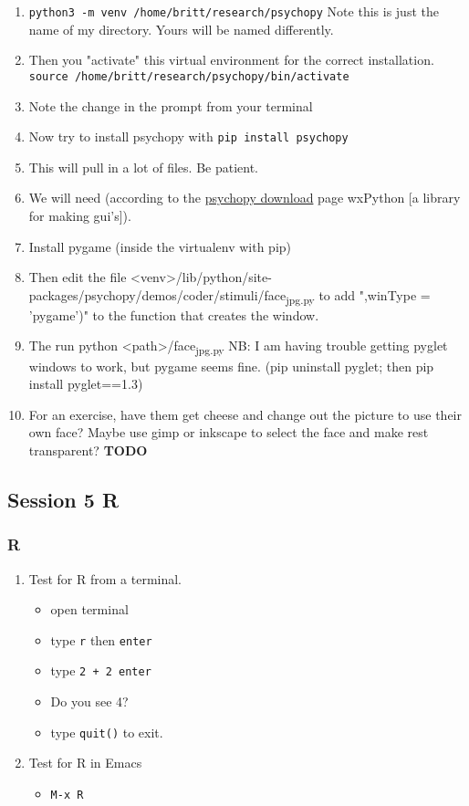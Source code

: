 \documentclass{article}
\begin{document}
\begin{enumerate}
\begin{enumerate}
\begin{enumerate}
\begin{enumerate}
\item \texttt{python3 -m venv /home/britt/research/psychopy}
Note this is just the name of my directory. Yours will be named differently.
\item Then you "activate" this virtual environment for the correct installation.
\texttt{source /home/britt/research/psychopy/bin/activate}
\item Note the change in the prompt from your terminal
\item Now try to install psychopy with
\texttt{pip install psychopy}
\item This will pull in  a lot of files. Be patient.
\item We will need (according to the \href{https://www.psychopy.org/download.html\#download}{psychopy download} page wxPython [a library for making gui's]).
\item Install pygame (inside the virtualenv with pip)
\item Then edit the file <venv>/lib/python/site-packages/psychopy/demos/coder/stimuli/face\textsubscript{jpg.py} to add ",winType = 'pygame')" to the function that creates the window.
\item The run python <path>/face\textsubscript{jpg.py}
NB: I am having trouble getting pyglet windows to work, but pygame seems fine. (pip uninstall pyglet; then pip install pyglet==1.3)
\item For an exercise, have them get cheese and change out the picture to use their own face? Maybe use gimp or inkscape to select the face and make rest transparent? \textbf{\textbf{TODO}}
\end{enumerate}
\end{enumerate}
\end{enumerate}
\end{enumerate}
\subsection{Session 5 R}
\label{sec:org61dea7c}
\subsubsection{R}
\label{sec:org0c17fac}
\begin{enumerate}
\item Test for R from a terminal.
\begin{itemize}
\item open terminal
\item type \texttt{r} then \texttt{enter}
\item type \texttt{2 + 2 enter}
\item Do you see 4?
\item type \texttt{quit()} to exit.
\end{itemize}
\item Test for R in Emacs
\begin{itemize}
\item \texttt{M-x R}
\end{itemize}
\end{enumerate}
\end{document}
